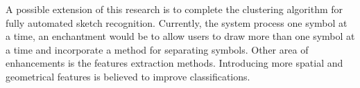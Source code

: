 \documentclass{article}
\begin{document}
 A possible extension of this research is to complete the clustering algorithm for fully automated sketch recognition. Currently, the system process one symbol at a time, an enchantment would be to allow users to draw more than one symbol at a time and incorporate a method for separating symbols. Other area of enhancements is the features extraction methods. Introducing more spatial and geometrical features is believed to improve classifications.  


\end{document}

